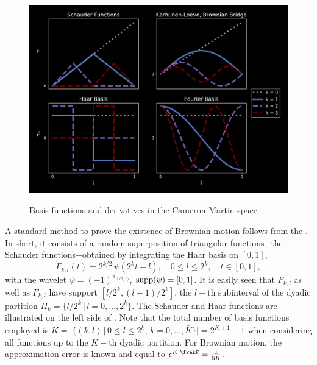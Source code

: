  \begin{figure}%
    \centering
     \caption{Basis functions and derivatives in the Cameron-Martin space.}
     \vspace{-2mm}
    \includegraphics[scale = 0.35]{KL/Figures/LevyCieselski2.pdf}
    \label{fig:CMS}
\end{figure}

\begin{example}\label{ex:BBC}

A standard method to prove the existence of Brownian motion follows from the . In short, it consists of a random superposition of triangular functions$-$the Schauder functions$-$obtained by integrating the Haar basis on $[0,1]$,
$$\dot{F}_{k,l}(t)=2^{k/2} \, \psi \left(2^{k}t-l\right),\quad 0 \le l \le 2^k,\quad t\in [0,1],$$
with the wavelet $\psi= (-1)^{ \mathds{1}_{[1/2, 1)}}$,  $\textnormal{supp}(\psi) = [0,1]$. It is easily seen that $\dot{F}_{k,l}$ as well as $F_{k,l}$ have support  
$[l/2^k,(l+1)/2^k]$, the $l-$th subinterval of the dyadic partition $\Pi_{k} = \{l/2^k\,|\, l = 0,\ldots,2^k\}$. 
The Schauder and Haar functions are illustrated on the left side of  .  Note that the total number of basis functions employed is $K = |\{(k,l) \,|\, 0 \le l \le 2^k , \, k=0,\ldots, \bar{K} \}| = 2^{\bar{K}+1}-1$ when considering all functions up to the $\bar{K}-$th dyadic partition. 
For Brownian motion, the approximation error is known \cite{Brown} and equal to  $\epsilon^{K,\frakF} = \frac{1}{6K}.$


\end{example}

